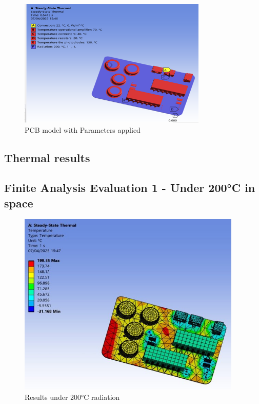 \begin{figure}[htbp]
    \centering
    \includegraphics[width=0.8\textwidth]{chapters/methodology/ThermalAnalysis/Fig1parameters.png}
    \caption{PCB model with Parameters applied}
    \label{fig:PCBparameters}
\end{figure}

\subsection{Thermal results}

\subsection{Finite Analysis Evaluation 1 - Under 200°C in space}

\begin{figure}[htbp]
    \centering
    \includegraphics[width=0.95\textwidth]{chapters/methodology/ThermalAnalysis/Fig2under200C.jpg}
    \caption{Results under 200°C radiation}
    \label{fig:results_200C}
\end{figure}

